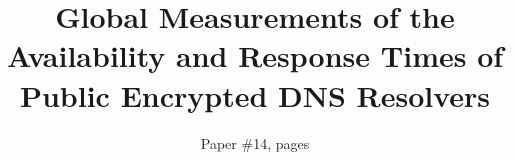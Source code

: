 \documentclass[conference=acm]{confpaper}
\title{Global Measurements of the Availability and Response Times of Public Encrypted DNS Resolvers}
\author{Paper \#14, \pageref{lastpage} pages}
\begin{document}
\begin{sloppypar}


\maketitle






\balance\label{lastpage}

\pagebreak



\pagebreak


\end{sloppypar}
\end{document}
